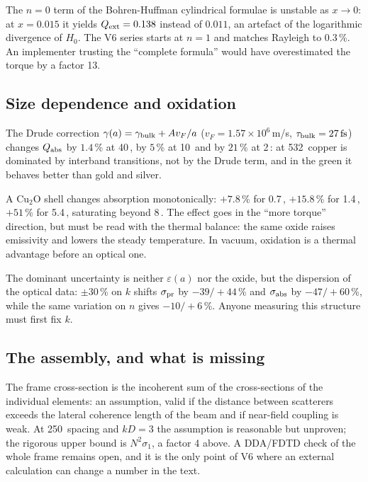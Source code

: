 \documentclass[11pt,a4paper]{article}
\providecommand{\SI}[2]{#1\,\text{#2}}
\begin{document}
The $n=0$ term of the Bohren-Huffman cylindrical formulae is unstable as $x\to0$: at
$x=0.015$ it yields $Q_{\rm ext}=0.138$ instead of $0.011$, an artefact of the
logarithmic divergence of $H_0$. The V6 series starts at $n=1$ and matches Rayleigh to
$0.3$\,\%. An implementer trusting the ``complete formula'' would have overestimated
the torque by a factor 13.

\subsection{Size dependence and oxidation}

The Drude correction $\gamma(a)=\gamma_{\rm bulk}+Av_F/a$ ($v_F=1.57\times10^6$\,m/s,
$\tau_{\rm bulk}=\SI{27}{fs}$) changes $Q_{\rm abs}$ by $1.4$\,\% at \SI{40}{nm}, by
$5$\,\% at \SI{10}{nm} and by $21$\,\% at \SI{2}{nm}: at \SI{532}{nm} copper is
dominated by interband transitions, not by the Drude term, and in the green it behaves
better than gold and silver.

A Cu$_2$O shell changes absorption monotonically: $+7.8$\,\% for \SI{0.7}{nm},
$+15.8$\,\% for \SI{1.4}{nm}, $+51$\,\% for \SI{5.4}{nm}, saturating beyond
\SI{8}{nm}. The effect goes in the ``more torque'' direction, but must be read with the
thermal balance: the same oxide raises emissivity and lowers the steady temperature.
In vacuum, oxidation is a thermal advantage before an optical one.

The dominant uncertainty is neither $\varepsilon(a)$ nor the oxide, but the dispersion
of the optical data: $\pm30$\,\% on $k$ shifts $\sigma_{\rm pr}$ by $-39/+44$\,\% and
$\sigma_{\rm abs}$ by $-47/+60$\,\%, while the same variation on $n$ gives
$-10/+6$\,\%. Anyone measuring this structure must first fix $k$.

\subsection{The assembly, and what is missing}

The frame cross-section is the incoherent sum of the cross-sections of the individual
elements: an assumption, valid if the distance between scatterers exceeds the lateral
coherence length of the beam and if near-field coupling is weak. At \SI{250}{nm}
spacing and $kD=3$ the assumption is reasonable but unproven; the rigorous upper bound
is $N^2\sigma_1$, a factor 4 above. A DDA/FDTD check of the whole frame remains open,
and it is the only point of V6 where an external calculation can change a number in
the text.
\end{document}
